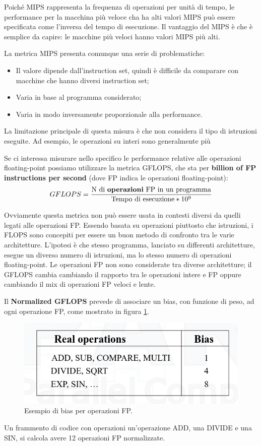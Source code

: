Poiché MIPS rappresenta la frequenza di operazioni per unità di tempo, le performance per la macchina più veloce cha ha alti valori MIPS può essere specificata come l'inversa del tempo di esecuzione. Il vantaggio del MIPS è che è semplice da capire: le macchine più veloci hanno valori MIPS più alti. 

La metrica MIPS presenta comunque una serie di problematiche:
\begin{itemize}
    \item Il valore dipende dall'instruction set, quindi è difficile da comparare con macchine che hanno diversi instruction set;
    \item Varia in base al programma considerato;
    \item Varia in modo inversamente proporzionale alla performance.
\end{itemize}

La limitazione principale di questa misura è che non considera il tipo di istruzioni eseguite. Ad esempio, le operazioni su interi sono generalmente più







Se ci interessa misurare nello specifico le performance relative alle operazioni floating-point possiamo utilizzare la metrica GFLOPS, che sta per \textbf{billion of FP instructions per second} (dove FP indica le operazioni floating-point):
\begin{align*}
    GFLOPS = \frac{\text{N di \textbf{operazioni} FP in un programma}}{\text{Tempo di esecuzione} * 10^9}
\end{align*}

Ovviamente questa metrica non può essere usata in contesti diversi da quelli legati alle operazioni FP. Essendo basata su operazioni piuttosto che istruzioni, i FLOPS sono concepiti per essere un buon metodo di confronto tra le varie architetture. L'ipotesi è che stesso programma, lanciato su differenti architetture, esegue un diverso numero di istruzioni, ma lo stesso numero di operazioni floating-point. Le operazioni FP non sono considerate tra diverse architetture; il GFLOPS cambia cambiando il rapporto tra le operazioni intere e FP oppure cambiando il mix di operazioni FP veloci e lente.

Il \textbf{Normalized GFLOPS} prevede di associare un bias, con funzione di peso, ad ogni operazione FP, come mostrato in figura \ref{fig:normalized-gflops}.
\begin{figure}[th]
	\centering
	\includegraphics[width=0.7\linewidth]{img/normalized-gflops.png}
	\caption{Esempio di bias per operazioni FP.}
	\label{fig:normalized-gflops}
\end{figure}

Un frammento di codice con operazioni un'operazione ADD, una DIVIDE e una SIN, si calcola avere 12 operazioni FP normalizzate.
















